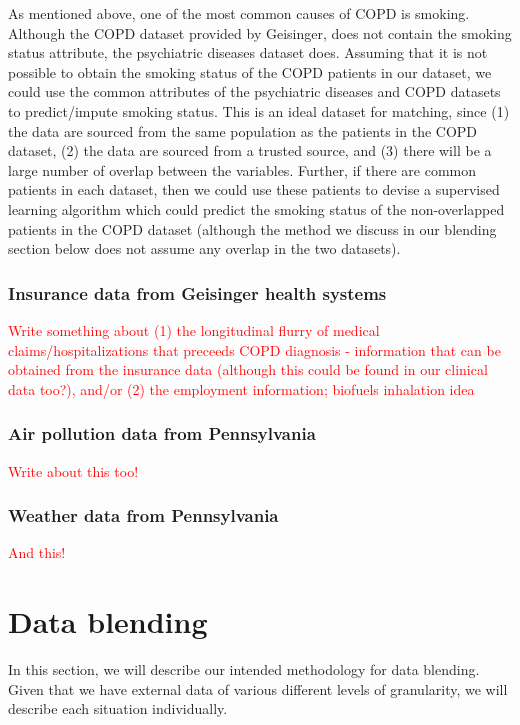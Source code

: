 \documentclass{article}
\begin{document}
As mentioned above, one of the most common causes of COPD is smoking. Although the COPD dataset provided by Geisinger, does not contain the smoking status attribute, the psychiatric diseases dataset does. Assuming that it is not possible to obtain the smoking status of the COPD patients in our dataset, we could use the common attributes of the psychiatric diseases and COPD datasets to predict/impute smoking status. This is an ideal dataset for matching, since (1) the data are sourced from the same population as the patients in the COPD dataset, (2) the data are sourced from a trusted source, and (3) there will be a large number of overlap between the variables. Further, if there are common patients in each dataset, then we could use these patients to devise a supervised learning algorithm which could predict the smoking status of the non-overlapped patients in the COPD dataset (although the method we discuss in our blending section below does not assume any overlap in the two datasets).


\subsubsection{Insurance data from Geisinger health systems}
\textcolor{red}{Write something about (1) the longitudinal flurry of medical claims/hospitalizations that preceeds COPD diagnosis - information that can be obtained from the insurance data (although this could be found in our clinical data too?), and/or (2) the employment information; biofuels inhalation idea}


\subsubsection{Air pollution data from Pennsylvania}
\textcolor{red}{Write about this too!}

\subsubsection{Weather data from Pennsylvania}
\textcolor{red}{And this!}





\section{Data blending}
In this section, we will describe our intended methodology for data blending. Given that we have external data of various different levels of granularity, we will describe each situation individually.
\end{document}
